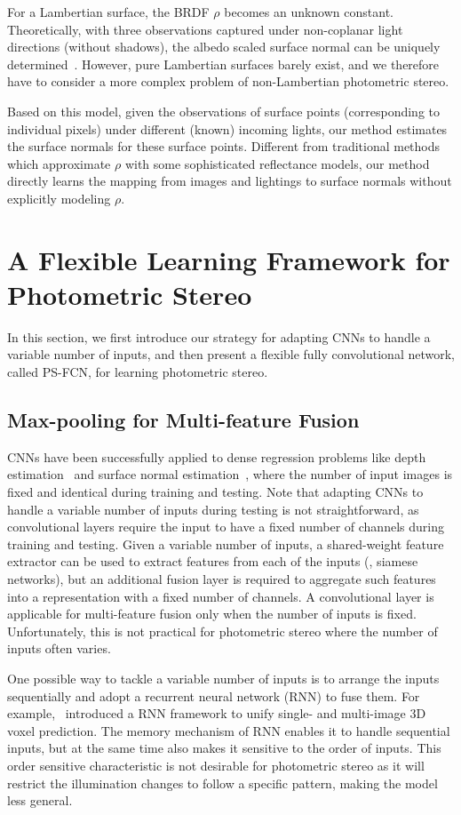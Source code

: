 For a Lambertian surface, the BRDF $\rho$ becomes an unknown constant. Theoretically, with three observations captured under non-coplanar light directions (without shadows), the albedo scaled surface normal can be uniquely determined~\cite{woodham1980ps}. 
However, pure Lambertian surfaces barely exist, and we therefore have to consider a more complex problem of non-Lambertian photometric stereo. 

Based on this model, given the observations of surface points (corresponding to individual pixels) under different (known) incoming lights, our method estimates the surface normals for these surface points. Different from traditional methods which approximate $\rho$ with some sophisticated reflectance models, our method directly learns the mapping from images and lightings to surface normals without explicitly modeling $\rho$.

\section{A Flexible Learning Framework for Photometric Stereo}
In this section, we first introduce our strategy for adapting CNNs to handle a variable number of inputs, and then present a flexible fully convolutional network, called PS-FCN, for learning photometric stereo. 

\subsection{Max-pooling for Multi-feature Fusion}
CNNs have been successfully applied to dense regression problems like depth estimation~\cite{eigen2014depth} and surface normal estimation~\cite{wang2015designing}, where the number of input images is fixed and identical during training and testing. Note that adapting CNNs to handle a variable number of inputs during testing is not straightforward, as convolutional layers require the input to have a fixed number of channels during training and testing. Given a variable number of inputs, a shared-weight feature extractor can be used to extract features from each of the inputs (\eg, siamese networks), but an additional fusion layer is required to aggregate such features into a representation with a fixed number of channels. A convolutional layer is applicable for multi-feature fusion only when the number of inputs is fixed. Unfortunately, this is not practical for photometric stereo where the number of inputs often varies.

One possible way to tackle a variable number of inputs is to arrange the inputs sequentially and adopt a recurrent neural network (RNN) to fuse them. For example,~\cite{choy20163d} introduced a RNN framework to unify single- and multi-image 3D voxel prediction. The memory mechanism of RNN enables it to handle sequential inputs, but at the same time also makes it sensitive to the order of inputs. This order sensitive characteristic is not desirable for photometric stereo as it will restrict the illumination changes to follow a specific pattern, making the model less general.

